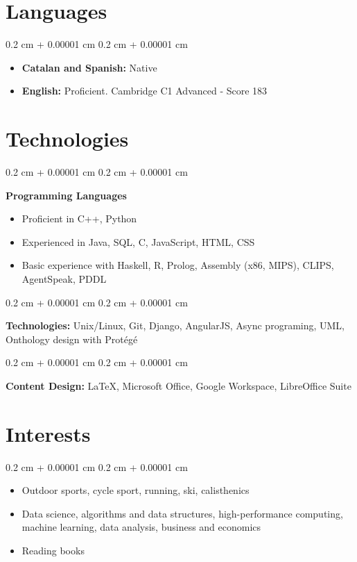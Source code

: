\documentclass[10pt, letterpaper]{article}
\newenvironment{highlightsforbulletentries}{
    \begin{itemize}[
        topsep=0.10 cm,
        parsep=0.10 cm,
        partopsep=0pt,
        itemsep=0pt,
        leftmargin=10pt
    ]
}{
    \end{itemize}
} %
\newenvironment{onecolentry}{
    \begin{adjustwidth}{
        0.2 cm + 0.00001 cm
    }{
        0.2 cm + 0.00001 cm
    }
}{
    \end{adjustwidth}
} %
\begin{document}
    \section{Languages}
        \begin{onecolentry}
            \begin{highlightsforbulletentries}
                \item \textbf{Catalan and Spanish:} Native
                \item \textbf{English:} Proficient. Cambridge C1 Advanced - Score 183
            \end{highlightsforbulletentries}
        \end{onecolentry}

    
    \section{Technologies}
        \begin{onecolentry}
            \textbf{Programming Languages}
                \begin{highlightsforbulletentries}
                    \item Proficient in C++, Python
                    \item Experienced in Java, SQL, C, JavaScript, HTML, CSS
                    \item Basic experience with Haskell, R, Prolog, Assembly (x86, MIPS), CLIPS, AgentSpeak, PDDL
                \end{highlightsforbulletentries}
        \end{onecolentry}

        \vspace{0.2 cm}

        \begin{onecolentry}
            \textbf{Technologies:} Unix/Linux, Git, Django, AngularJS, Async programing, UML, Onthology design
            with Protégé
        \end{onecolentry}
        
        \vspace{0.2 cm}
        
        \begin{onecolentry}
            \textbf{Content Design:} LaTeX, Microsoft Office, Google Workspace, LibreOffice Suite
        \end{onecolentry}


    \section{Interests}
        \begin{onecolentry}
            \begin{highlightsforbulletentries}
                \item Outdoor sports, cycle sport, running, ski, calisthenics
                \item Data science, algorithms and data structures, high-performance computing, machine learning, data analysis, business and economics
                \item Reading books
            \end{highlightsforbulletentries}
        \end{onecolentry}
    
\end{document}
